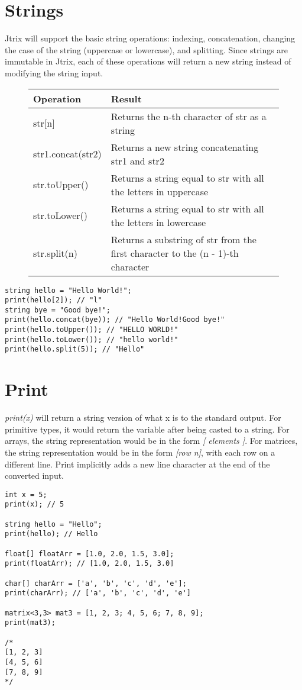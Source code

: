 \documentclass[12pt]{report}
\begin{document}
\pagebreak

\section{Strings}
Jtrix will support the basic string operations: indexing, concatenation, changing the case of the string (uppercase or lowercase), and splitting. Since strings are immutable in Jtrix, each of these operations will return a new string instead of modifying the string input.
\begin{figure}[h]
\begin{tabular}{|l|l|}
\hline
Operation     & Result                                                                          \\ \hline
str{[}n{]}    & Returns the n-th character of str as a string                                   \\ \hline
str1.concat(str2)   & Returns a new string concatenating str1 and str2                                \\ \hline
str.toUpper() & Returns a string equal to str with all the letters in uppercase                 \\ \hline
str.toLower() & Returns a string equal to str with all the letters in lowercase                 \\ \hline
str.split(n)  & Returns a substring of str from the first character to the (n - 1)-th character \\ \hline
\end{tabular}
\end{figure}
\begin{lstlisting}
string hello = "Hello World!";
print(hello[2]); // "l"
string bye = "Good bye!";
print(hello.concat(bye)); // "Hello World!Good bye!"
print(hello.toUpper()); // "HELLO WORLD!"
print(hello.toLower()); // "hello world!"
print(hello.split(5)); // "Hello" 
\end{lstlisting}
\section{Print}
\textit{print(x)} will return a string version of what x is to the standard output. For primitive types, it would return the variable after being casted to a string. For arrays, the string representation would be in the form \textit{[ elements ]}. For matrices, the string representation would be in the form \textit{[row n]}, with each row on a different line. Print implicitly adds a new line character at the end of the converted input.
\begin{lstlisting}
int x = 5;
print(x); // 5

string hello = "Hello";
print(hello); // Hello

float[] floatArr = [1.0, 2.0, 1.5, 3.0];
print(floatArr); // [1.0, 2.0, 1.5, 3.0]

char[] charArr = ['a', 'b', 'c', 'd', 'e'];
print(charArr); // ['a', 'b', 'c', 'd', 'e']

matrix<3,3> mat3 = [1, 2, 3; 4, 5, 6; 7, 8, 9];
print(mat3);

/* 
[1, 2, 3]
[4, 5, 6]
[7, 8, 9]
*/
\end{lstlisting}
\end{document}
